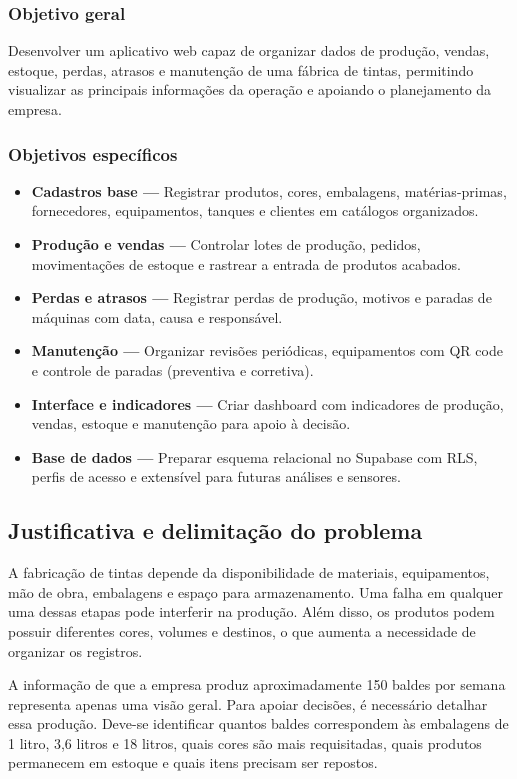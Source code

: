 \documentclass[12pt,a4paper]{article}
\begin{document}
\subsubsection*{Objetivo geral}
Desenvolver um aplicativo web capaz de organizar dados de produção, vendas, estoque, perdas, atrasos e manutenção de uma fábrica de tintas, permitindo visualizar as principais informações da operação e apoiando o planejamento da empresa.

\subsubsection*{Objetivos específicos}
\begin{itemize}
\item \textbf{Cadastros base —} Registrar produtos, cores, embalagens, matérias-primas, fornecedores, equipamentos, tanques e clientes em catálogos organizados.
\item \textbf{Produção e vendas —} Controlar lotes de produção, pedidos, movimentações de estoque e rastrear a entrada de produtos acabados.
\item \textbf{Perdas e atrasos —} Registrar perdas de produção, motivos e paradas de máquinas com data, causa e responsável.
\item \textbf{Manutenção —} Organizar revisões periódicas, equipamentos com QR code e controle de paradas (preventiva e corretiva).
\item \textbf{Interface e indicadores —} Criar dashboard com indicadores de produção, vendas, estoque e manutenção para apoio à decisão.
\item \textbf{Base de dados —} Preparar esquema relacional no Supabase com RLS, perfis de acesso e extensível para futuras análises e sensores.
\end{itemize}

\subsection{Justificativa e delimitação do problema}
A fabricação de tintas depende da disponibilidade de materiais, equipamentos, mão de obra, embalagens e espaço para armazenamento. Uma falha em qualquer uma dessas etapas pode interferir na produção. Além disso, os produtos podem possuir diferentes cores, volumes e destinos, o que aumenta a necessidade de organizar os registros.

A informação de que a empresa produz aproximadamente 150 baldes por semana representa apenas uma visão geral. Para apoiar decisões, é necessário detalhar essa produção. Deve-se identificar quantos baldes correspondem às embalagens de 1 litro, 3,6 litros e 18 litros, quais cores são mais requisitadas, quais produtos permanecem em estoque e quais itens precisam ser repostos.
\end{document}
